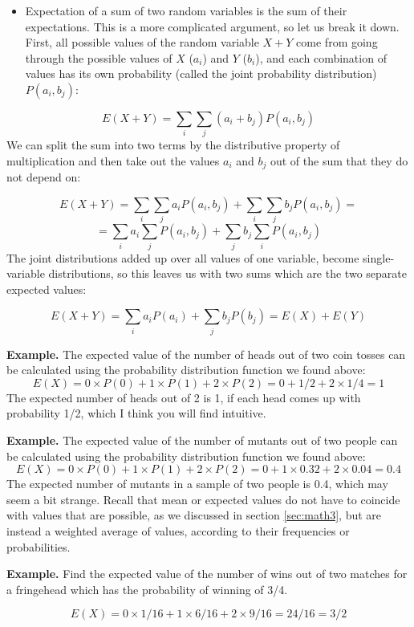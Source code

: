 \documentclass[
  letterpaper,
  DIV=11,
  numbers=noendperiod]{scrreprt}
\providecommand{\tightlist}{%
  \setlength{\itemsep}{0pt}\setlength{\parskip}{0pt}}\usepackage{longtable,booktabs,array}
\begin{document}
\begin{itemize}
\tightlist
\item
  Expectation of a sum of two random variables is the sum of their
  expectations. This is a more complicated argument, so let us break it
  down. First, all possible values of the random variable \(X+Y\) come
  from going through the possible values of \(X\) (\(a_i\)) and \(Y\)
  (\(b_i\)), and each combination of values has its own probability
  (called the joint probability distribution) \(P(a_i, b_j)\):
\end{itemize}

\[E(X+Y) = \sum_i \sum_j (a_i+b_j) P(a_i, b_j)\] We can split the sum
into two terms by the distributive property of multiplication and then
take out the values \(a_i\) and \(b_j\) out of the sum that they do not
depend on:

\[E(X+Y) = \sum_i \sum_j a_i P(a_i, b_j) + \sum_i \sum_j b_j P(a_i, b_j)=\]
\[=\sum_i a_i  \sum_j  P(a_i, b_j) +  \sum_j b_j \sum_i P(a_i, b_j) \]
The joint distributions added up over all values of one variable, become
single-variable distributions, so this leaves us with two sums which are
the two separate expected values:

\[E(X+Y) =  \sum_i a_i P(a_i) +  \sum_j b_j P(b_j) = E(X) + E(Y) \]

\textbf{Example.} The expected value of the number of heads out of two
coin tosses can be calculated using the probability distribution
function we found above:
\[ E(X) = 0\times P(0) + 1 \times P(1) + 2 \times P(2) = 0+1/2+2 \times 1/4 = 1\]
The expected number of heads out of 2 is 1, if each head comes up with
probability 1/2, which I think you will find intuitive.

\textbf{Example.} The expected value of the number of mutants out of two
people can be calculated using the probability distribution function we
found above:
\[ E(X) = 0 \times P(0) + 1 \times P(1) + 2 \times P(2) = 0+1 \times 0.32+2 \times 0.04 = 0.4\]
The expected number of mutants in a sample of two people is 0.4, which
may seem a bit strange. Recall that mean or expected values do not have
to coincide with values that are possible, as we discussed in section
\ref{sec:math3}, but are instead a weighted average of values, according
to their frequencies or probabilities.

\textbf{Example.} Find the expected value of the number of wins out of
two matches for a fringehead which has the probability of winning of
3/4.

\[E(X) = 0 \times 1/16 + 1 \times 6/16 + 2 \times 9/16 = 24/16 = 3/2\]
\end{document}
